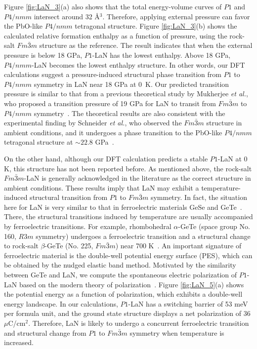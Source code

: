 	Figure \ref{fig:LaN_3}(a) also shows that the total energy-volume curves of $P1$ and $P4/nmm$ intersect around 32 \r{A}$^3$. Therefore, applying external pressure can favor the PbO-like $P4/nmm$ tetragonal structure. Figure \ref{fig:LaN_3}(b) shows the calculated relative formation enthalpy as a function of pressure, using the rock-salt $Fm\bar{3}m$ structure as the reference. The result indicates that when the external pressure is below 18 GPa, $P1$-LaN has the lowest enthalpy. Above 18 GPa, $P4/nmm$-LaN becomes the lowest enthalpy structure. In other words, our DFT calculations suggest a pressure-induced structural phase transition from $P1$ to $P4/nmm$ symmetry in LaN near 18 GPa at 0~K. Our predicted transition pressure is similar to that from a previous theoretical study by Mukherjee {\it et al.}, who proposed a transition pressure of 19 GPa for LaN to transit from $Fm\bar{3}m$ to $P4/nmm$ symmetry~\cite{LaN_pressure_theory}. The theoretical results are also consistent with the experimental finding by Schneider {\it et al.}, who observed the $Fm\bar{3}m$ structure in ambient conditions, and it undergoes a phase transition to the PbO-like $P4/nmm$ tetragonal structure at $\sim 22.8$ GPa~\cite{LaN_pressure_exp}.


	
	On the other hand, although our DFT calculation predicts a stable $P1$-LaN at 0 K, this structure has not been reported before. As mentioned above, the rock-salt $Fm\bar{3}m$-LaN is generally acknowledged in the literature as the correct structure in ambient conditions. These results imply that LaN may exhibit a temperature-induced structural transition from $P1$ to $Fm\bar{3}m$ symmetry. In fact, the situation here for LaN is very similar to that in ferroelectric materials GeSe and GeTe~\cite{GeSe,GeTe_Xia}. There, the structural transitions induced by temperature are usually accompanied by ferroelectric transitions. For example, rhombohedral $\alpha$-GeTe (space group No. 160, $R3m$ symmetry) undergoes a ferroelectric transition and a structural change to rock-salt $\beta$-GeTe (No. 225, $Fm\bar{3}m$) near 700 K~\cite{GeTe_Xia}. An important signature of ferroelectric material is the double-well potential energy surface (PES), which can be obtained by the nudged elastic band method. Motivated by the similarity between GeTe and LaN, we compute the spontaneous electric polarization of $P1$-LaN based on the modern theory of polarization~\cite{modern_polarization}. Figure \ref{fig:LaN_5}(a) shows the potential energy as a function of polarization, which exhibits a double-well energy landscape. In our calculations, $P1$-LaN has a switching barrier of 53 meV per formula unit, and the ground state structure displays a net polarization of 36 $\mu$C/cm$^2$. Therefore, LaN is likely to undergo a concurrent ferroelectric transition and structural change from $P1$ to $Fm\bar{3}m$ symmetry when temperature is increased.


